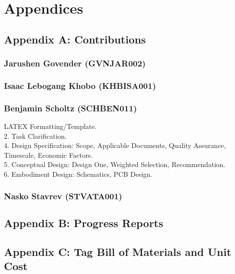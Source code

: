 \section*{Appendices}
\subsection*{Appendix A: Contributions}

\subsubsection*{Jarushen Govender (GVNJAR002)}
\subsubsection*{Isaac Lebogang Khobo (KHBISA001)}
\subsubsection*{Benjamin Scholtz (SCHBEN011)}
LATEX Formatting/Template. \\
2. Task Clarification. \\
4. Design Specification: Scope, Applicable Documents, Quality Assurance, Timescale, Economic Factors. \\
5. Conceptual Design: Design One, Weighted Selection, Recommendation. \\
6. Embodiment Design: Schematics, PCB Design. \\
\subsubsection*{Nasko Stavrev (STVATA001)}

\newpage
\subsection*{Appendix B: Progress Reports}

\subsection*{Appendix C: Tag Bill of Materials and Unit Cost}

